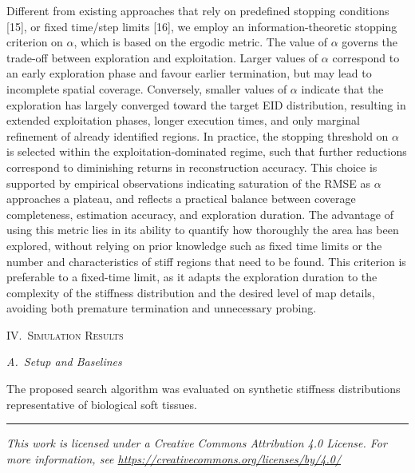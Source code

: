 \documentclass[11pt]{article}
\begin{document}
\noindent
Different from existing approaches that rely on predefined stopping
conditions [15], or fixed time/step limits [16], we employ an
information-theoretic stopping criterion on $\alpha$, which is based
on the ergodic metric. The value of $\alpha$ governs the trade-off
between exploration and exploitation. Larger values of $\alpha$
correspond to an early exploration phase and favour earlier
termination, but may lead to incomplete spatial coverage. Conversely,
smaller values of $\alpha$ indicate that the exploration has largely
converged toward the target EID distribution, resulting in extended
exploitation phases, longer execution times, and only marginal
refinement of already identified regions. In practice, the stopping
threshold on $\alpha$ is selected within the exploitation-dominated
regime, such that further reductions correspond to diminishing
returns in reconstruction accuracy. This choice is supported by
empirical observations indicating saturation of the RMSE as $\alpha$
approaches a plateau, and reflects a practical balance between
coverage completeness, estimation accuracy, and exploration duration.
The advantage of using this metric lies in its ability to quantify
how thoroughly the area has been explored, without relying on prior
knowledge such as fixed time limits or the number and characteristics
of stiff regions that need to be found. This criterion is preferable
to a fixed-time limit, as it adapts the exploration duration to the
complexity of the stiffness distribution and the desired level of map
details, avoiding both premature termination and unnecessary probing.

\vspace{0.8em}

\begin{center}
\textsc{IV.\ Simulation Results}
\end{center}

\noindent\textit{A.~Setup and Baselines}

\vspace{0.2em}

\noindent
The proposed search algorithm was evaluated on synthetic stiffness
distributions representative of biological soft tissues.

\vfill
\hrule
\vspace{0.3em}
\begin{center}
{\footnotesize\itshape
This work is licensed under a Creative Commons Attribution 4.0
License. For more information, see
\url{https://creativecommons.org/licenses/by/4.0/}\par}
\end{center}
\end{document}
